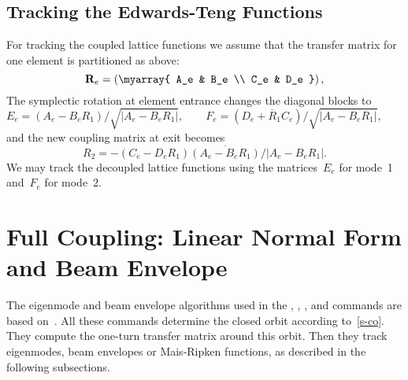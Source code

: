 \subsection{Tracking the Edwards-Teng Functions}

For tracking the coupled lattice functions we assume that the
transfer matrix for one element is partitioned as above:
\[
\mathrm{\bf R}_e = \left( \myarray{ A_e & B_e \\ C_e & D_e } \right),
\]
The symplectic rotation at element entrance changes the diagonal
blocks to
\[
E_e = (A_e - B_e R_1) / \sqrt{|A_e - B_e R_1|}, \qquad
F_e = (D_e + \overline{R}_1 C_e) / \sqrt{|A_e - B_e R_1|}, \qquad
\]
and the new coupling matrix at exit becomes
\[
R_2 = - (C_e - D_e R_1) \overline{(A_e - B_e R_1)} / |A_e - B_e R_1|.
\]
We may track the decoupled lattice functions using the
matrices~$E_e$ for mode~1 and~$F_e$ for mode~2.

\section{Full Coupling: Linear Normal Form and Beam Envelope}
\label{EMNORM}
The eigenmode and beam envelope algorithms used in the
, , , and
 commands are based on~\cite{DRA82,MAI82,RIP70}.
All these commands determine the closed orbit according to~\ref{s-co}.
They compute the one-turn transfer matrix around this orbit.
Then they track eigenmodes, beam envelopes or Mais-Ripken functions,
as described in the following subsections.

